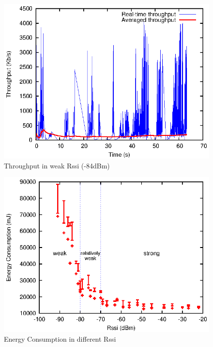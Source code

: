 \documentclass[journal]{IEEEtran}
\begin{document}
\begin{figure}
\centering
\includegraphics[scale=0.95]{weak_traffic.eps}
\caption{Throughput in weak Rssi (-84dBm)}
\end{figure}

\begin{figure}
\centering
\includegraphics[scale=0.95]{rssi_energy.eps}
\caption{Energy Consumption in different Rssi}
\end{figure}
\end{document}
